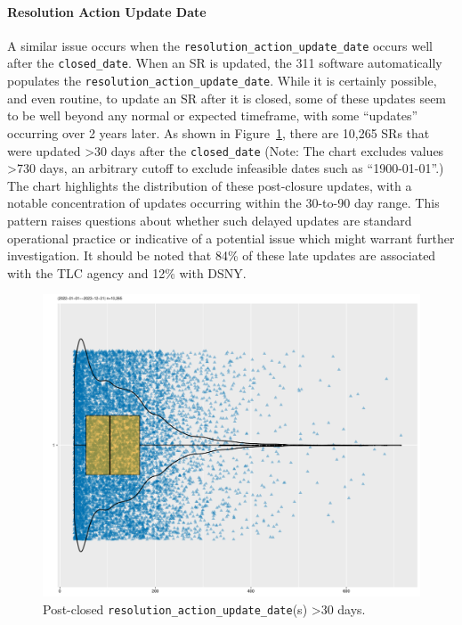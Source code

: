 \documentclass[linenumber]{jdsart}
\begin{document}
\paragraph{Resolution Action Update Date}
A similar issue occurs when the \texttt{resolution\_action\_update\_date} 
occurs well after the \texttt{closed\_date}.  When an SR is 
updated, the 311 software automatically populates the \texttt{resolution\_action\_update\_date}. While it is certainly 
possible, and even routine, to update an SR after it is closed, 
some of these updates seem to be well beyond any normal or expected 
timeframe, with some ``updates'' occurring over 2 years 
later. As shown in Figure~\ref{fig:resolution-violin}, there 
are 10,265 SRs that were updated >30 days after the 
\texttt{closed\_date} (Note: The chart excludes values >730 days, 
an arbitrary cutoff to exclude infeasible dates such as ``1900-01-01''.)
 The chart highlights the distribution of these post-closure 
 updates, with a notable concentration of updates occurring within 
the 30\mbox{-}to\mbox{-}90 day range. This pattern raises 
questions about whether such delayed updates are standard 
operational practice or indicative of a potential issue 
which might warrant further investigation. It should be noted
that 84\% of these late updates are associated with the TLC agency
and 12\% with DSNY.

\begin{figure}[tbp]
  \centering
  \includegraphics[width=\textwidth]{post_closed_violin_chart.pdf}
  \caption{Post-closed \texttt{resolution\_action\_update\_date}(s) >30 days.}
  \label{fig:resolution-violin}
\end{figure}
\end{document}
